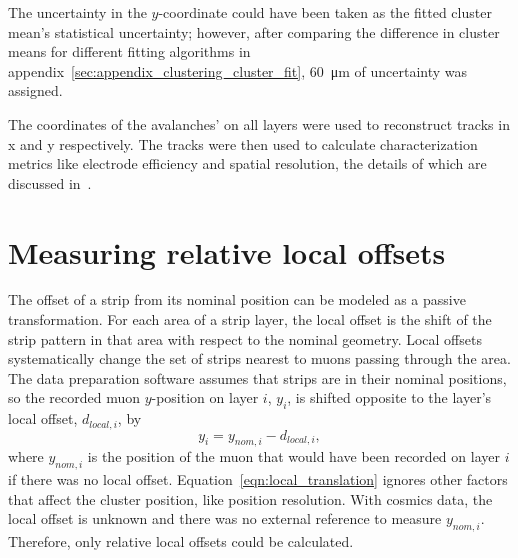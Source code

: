 The uncertainty in the $y$-coordinate could have been taken as the fitted cluster mean's statistical uncertainty; however, after comparing the difference in cluster means for different fitting algorithms in appendix~\ref{sec:appendix_clustering_cluster_fit}, \SI{60}{\micro\meter} of uncertainty was assigned.

The coordinates of the avalanches' on all layers were used to reconstruct tracks in x and y respectively. The tracks were then used to calculate characterization metrics like electrode efficiency and spatial resolution, the details of which are discussed in~\cite{lefebvre_thesis}.



\section{Measuring relative local offsets}

The offset of a strip from its nominal position can be modeled as a passive transformation. For each area of a strip layer, the local offset is the shift of the strip pattern in that area with respect to the nominal geometry.  Local offsets systematically change the set of strips nearest to muons passing through the area. The data preparation software assumes that strips are in their nominal positions, so the recorded muon $y$-position on layer $i$, $y_i$, is shifted opposite to the layer's local offset, $d_{local, i}$, by
\begin{equation}
    y_i = y_{nom, i} - d_{local, i},
    \label{eqn:local_translation}
\end{equation}
where $y_{nom, i}$ is the position of the muon that would have been recorded on layer $i$ if there was no local offset. Equation~\ref{eqn:local_translation} ignores other factors that affect the cluster position, like position resolution. With cosmics data, the local offset is unknown and there was no external reference to measure $y_{nom, i}$. Therefore, only relative local offsets could be calculated. 

